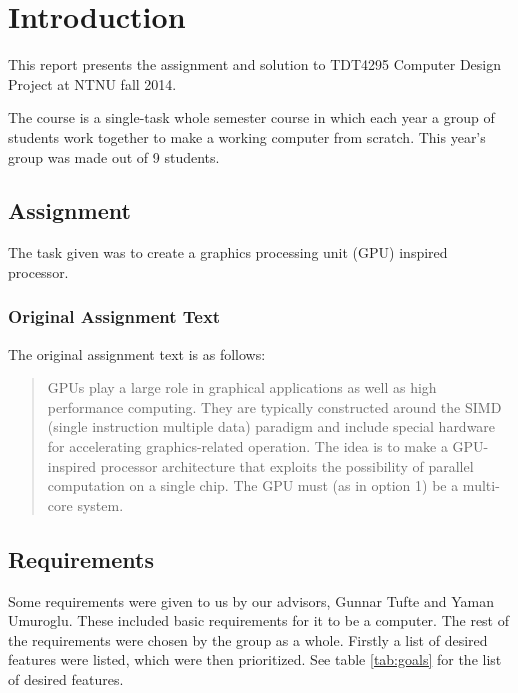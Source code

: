 \documentclass[../main/report.tex]{subfiles}
\begin{document}
\chapter{Introduction}
\label{sec:intro}

This report presents the assignment and solution to TDT4295 Computer Design Project at NTNU fall 2014.

The course is a single-task whole semester course in which each year a group of students
work together to make a working computer from scratch.
This year's group was made out of 9 students.

\section{Assignment}
The task given was to create a graphics processing unit (GPU) inspired processor.


\subsection{Original Assignment Text}

The original assignment text\cite{assignment} is as follows:

\begin{quotation}
    GPUs play a large role in graphical applications as well as high performance computing. They
    are typically constructed around the SIMD (single instruction multiple data) paradigm and
    include special hardware for accelerating graphics-related operation. The idea is to make a
    GPU-inspired processor architecture that exploits the possibility of parallel computation on a
    single chip. The GPU must (as in option 1) be a multi-core system.
\end{quotation}

\section{Requirements}

Some requirements were given to us by our advisors, Gunnar Tufte and Yaman Umuroglu.
These included basic requirements for it to be a computer.
The rest of the requirements were chosen by the group as a whole.
Firstly a list of desired features were listed, which were then prioritized.
See table \ref{tab:goals} for the list of desired features.
\end{document}
